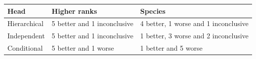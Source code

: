 
\begin{tabular}{lll}
\toprule
Head & Higher ranks & Species\\
\midrule
Hierarchical & 5 better and 1 inconclusive & 4 better, 1 worse and 1 inconclusive\\
Independent & 5 better and 1 inconclusive & 1 better, 3 worse and 2 inconclusive\\
Conditional & 5 better and 1 worse & 1 better and 5 worse\\
\bottomrule
\end{tabular}
